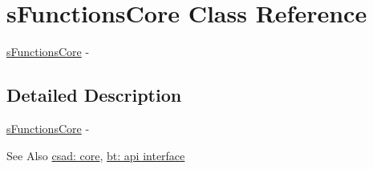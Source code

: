 \hypertarget{structs_functions_core}{\section{s\-Functions\-Core Class Reference}
\label{structs_functions_core}
}


\hyperlink{structs_functions_core}{s\-Functions\-Core} -\/  




\subsection{Detailed Description}
\hyperlink{structs_functions_core}{s\-Functions\-Core} -\/ 

\begin{DoxySeeAlso}{See Also}
\hyperlink{group__core}{csad\-: core}, \hyperlink{group__apiinterface}{bt\-: api interface} 
\end{DoxySeeAlso}
